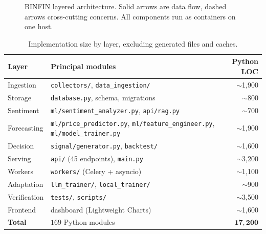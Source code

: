 \documentclass[preprint,12pt,authoryear]{elsarticle}
\begin{document}
\begin{figure}[t]
{}
\caption{BINFIN layered architecture. Solid arrows are data flow, dashed arrows
cross-cutting concerns. All components run as containers on one host.}
\label{fig:arch}
\end{figure}

\begin{table}[t]\centering\small
\caption{Implementation size by layer, excluding generated files and caches.}
\label{tab:components}
\begin{tabular}{@{}llr@{}}
\toprule
Layer & Principal modules & Python LOC \\
\midrule
Ingestion    & \texttt{collectors/}, \texttt{data\_ingestion/} & $\sim$1{,}900 \\
Storage      & \texttt{database.py}, schema, migrations        & $\sim$800 \\
Sentiment    & \texttt{ml/sentiment\_analyzer.py}, \texttt{api/rag.py} & $\sim$700 \\
Forecasting  & \texttt{ml/price\_predictor.py}, \texttt{ml/feature\_engineer.py}, \texttt{ml/model\_trainer.py} & $\sim$1{,}900 \\
Decision     & \texttt{signal/generator.py}, \texttt{backtest/} & $\sim$1{,}600 \\
Serving      & \texttt{api/} (45 endpoints), \texttt{main.py}   & $\sim$3{,}200 \\
Workers      & \texttt{workers/} (Celery + asyncio)             & $\sim$1{,}100 \\
Adaptation   & \texttt{llm\_trainer/}, \texttt{local\_trainer/} & $\sim$900 \\
Verification & \texttt{tests/}, \texttt{scripts/}               & $\sim$3{,}500 \\
Frontend     & dashboard (Lightweight Charts)                   & $\sim$1{,}600 \\
\midrule
\textbf{Total} & $169$ Python modules & $\mathbf{17{,}200}$ \\
\bottomrule
\end{tabular}
\end{table}
\end{document}
